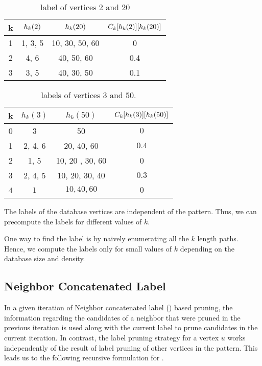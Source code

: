 \begin{table}[h]
    \centering
    \begin{tabular}{|c|c|c|c|}
        \hline
        k & $h_{k}(2)$ & $h_{k}(20)$ & $C_{k}[h_{k}(2)][h_{k}(20)]$\\
        \hline
        1 & 1, 3, 5 & 10, 30, 50, 60 & 0 \\
        2 & 4, 6 & 40, 50, 60 & 0.4 \\
        3 & 3, 5 & 40, 30, 50 & 0.1\\
        \hline
    \end{tabular}
    \caption{\khop label of vertices $2$ and $20$}
    \label{tab:khop220}
\end{table}

\begin{table}[h]
    \centering
    \begin{tabular}{|c|c|c|c|}
        \hline
        k & $h_k(3)$ & $h_k(50)$ & $C_{k}[h_{k}(3)][h_{k}(50)]$ \\
        \hline
        0 & 3 & 50 & $0$\\
        1 & 2, 4, 6 & 20, 40, 60 & $0.4$ \\
        2 & 1, 5 & 10, 20 , 30, 60 & 0\\
        3 & 2, 4, 5 & 10, 20, 30, 40 & $0.3$ \\
        4 & $1$ & $10, 40, 60$ & $0$ \\
        \hline
    \end{tabular}
    \caption{\khop labels of vertices $3$ and $50$.}
    \label{tab:khop350}
\end{table}


\smallskip{} The \khop
labels of the database vertices are independent of the pattern. Thus, we
can precompute the \khop labels for different values of $k$.


One way to find the \khop label is by naively
enumerating all the $k$ length paths.
Hence, we compute the \khop labels only for small values of $k$ depending on the
database size and density. 





\subsection{Neighbor Concatenated Label} 
In a given iteration of Neighbor concatenated label (\ncl) based pruning,
the information regarding the candidates of a neighbor that were pruned 
in the previous iteration is used along with the current \khop label to
prune candidates in the current iteration. In contrast, the \khop label
pruning strategy for a vertex $u$ works independently of the result of
\khop label pruning of other vertices in the pattern. This leads us
to the following recursive formulation for \ncl.

